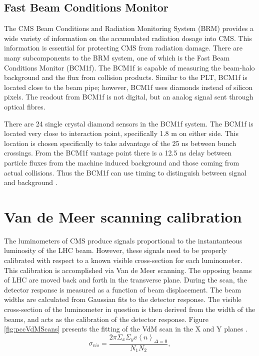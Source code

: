 \subsection{Fast Beam Conditions Monitor}

The CMS Beam Conditions and Radiation Monitoring System (BRM) provides a wide variety of information on the accumulated radiation dosage into CMS. This information is essential for protecting CMS from radiation damage. There are many subcomponents to the BRM system, one of which is the Fast Beam Conditions Monitor (BCM1f). The BCM1f is capable of measuring the beam-halo background and the flux from collision products. Similar to the PLT, BCM1f is located close to the beam pipe; however, BCM1f uses diamonds instead of silicon pixels. The readout from BCM1f is not digital, but an analog signal sent through optical fibres. 

There are 24 single crystal diamond sensors in the BCM1f system. The BCM1f is located very close to interaction point, specifically 1.8 m on either side. This location is chosen specifically to take advantage of the 25 ns between bunch crossings. From the BCM1f vantage point there is a 12.5 ns delay between particle fluxes from the machine induced background and those coming from actual collisions. Thus the BCM1f can use timing to distinguish between signal and background \cite{Guthoff:2017ibf}.  

\section{Van de Meer scanning calibration}

The luminometers of CMS produce signals proportional to the instantanteous luminosity of the LHC beam. However, these signals need to be properly calibrated with respect to a known visible cross-section for each luminometer. This calibration is accomplished via Van de Meer scanning. The opposing beams of LHC are moved back and forth in the transverse plane. During the scan, the detector response is measured as a function of beam displacement. The beam widths are calculated from Gaussian fits to the detector response. The visible cross-section of the luminometer in question is then derived from the width of the beams, and acts as the calibration of the detector response. Figure \ref{fig:pccVdMScans} presents the fitting of the VdM scan in the X and Y planes \cite{CMS:2013gfa}. 
\begin{equation}
\sigma_{vis} = \frac{2 \pi \Sigma_x \Sigma_y v\left \langle n \right \rangle_{\Delta=0}}{N_1 N_2},
\end{equation}

